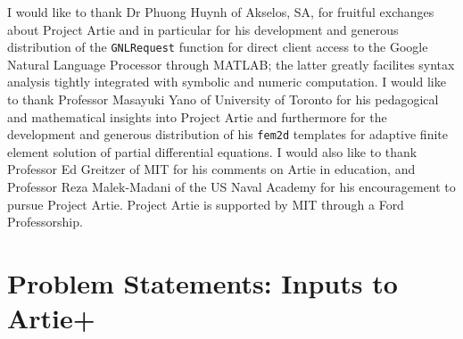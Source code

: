 \documentclass[preprint,12pt]{article}
\begin{document}
I would like to thank Dr Phuong Huynh of Akselos, SA, for fruitful exchanges about Project Artie and in particular for his development and generous distribution of the \texttt{GNLRequest} function for direct client access to the Google Natural Language Processor through MATLAB;  the latter greatly facilites syntax analysis tightly integrated with symbolic and numeric computation. I would like to thank Professor Masayuki Yano of University of Toronto for his pedagogical and mathematical insights into Project Artie and furthermore for the development and generous distribution of his \texttt{fem2d}  templates for  adaptive finite element solution of partial differential equations. I would also like to thank Professor Ed Greitzer of MIT for his comments on Artie in education, and Professor Reza Malek-Madani of the US Naval Academy for his encouragement to pursue Project Artie. Project Artie is supported by MIT through a Ford Professorship.





\footnotesize





\newpage
\appendix
\section{Problem Statements: Inputs to Artie+}





%

%
%
\end{document}
